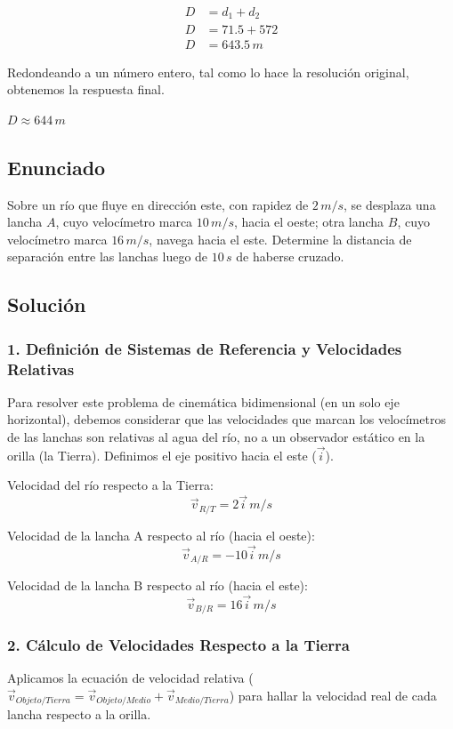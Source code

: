 \documentclass[12pt, a4paper]{article}
\begin{document}
\begin{align*}
D &= d_1 + d_2 \\
D &= 71.5 + 572 \\
D &= 643.5 \, \si{m}
\end{align*}

Redondeando a un número entero, tal como lo hace la resolución original, obtenemos la respuesta final.

\begin{tcolorbox}[colback=green!5!white, colframe=green!50!black, title=Respuesta Final]
\centering \Large $D \approx 644 \, \si{m}$
\end{tcolorbox}

\newpage

\subsection*{Enunciado}
Sobre un río que fluye en dirección este, con rapidez de $2 \, \si{m/s}$, se desplaza una lancha $A$, cuyo velocímetro marca $10 \, \si{m/s}$, hacia el oeste; otra lancha $B$, cuyo velocímetro marca $16 \, \si{m/s}$, navega hacia el este. Determine la distancia de separación entre las lanchas luego de $10 \, \si{s}$ de haberse cruzado.

\subsection*{Solución}

\subsubsection*{1. Definición de Sistemas de Referencia y Velocidades Relativas}
Para resolver este problema de cinemática bidimensional (en un solo eje horizontal), debemos considerar que las velocidades que marcan los velocímetros de las lanchas son relativas al agua del río, no a un observador estático en la orilla (la Tierra).
Definimos el eje positivo hacia el este ($\vec{i}$).

Velocidad del río respecto a la Tierra:
$$ \vec{v}_{R/T} = 2\vec{i} \, \si{m/s} $$

Velocidad de la lancha A respecto al río (hacia el oeste):
$$ \vec{v}_{A/R} = -10\vec{i} \, \si{m/s} $$

Velocidad de la lancha B respecto al río (hacia el este):
$$ \vec{v}_{B/R} = 16\vec{i} \, \si{m/s} $$

\subsubsection*{2. Cálculo de Velocidades Respecto a la Tierra}
Aplicamos la ecuación de velocidad relativa ($\vec{v}_{Objeto/Tierra} = \vec{v}_{Objeto/Medio} + \vec{v}_{Medio/Tierra}$) para hallar la velocidad real de cada lancha respecto a la orilla.
\end{document}

